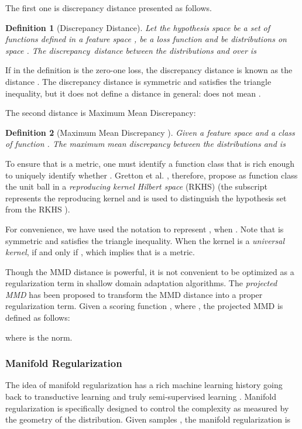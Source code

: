\documentclass[journal]{IEEEtran}
\newtheorem{Definition}{Definition}
\begin{document}
The first one is discrepancy distance presented as follows.
\begin{Definition}[{Discrepancy Distance}\cite{DBLP:conf/colt/MansourMR09}]\label{d0}Let the hypothesis space  be a set of functions defined in a feature space ,   be a  loss function and  be distributions on space . The {discrepancy~distance}  between the distributions  and  over  is

\end{Definition}

If  in the definition is the zero-one loss, the discrepancy  distance is known as the  distance \cite{DBLP:conf/nips/Ben-DavidBCP06}. The discrepancy distance is symmetric and satisfies the triangle inequality,
but it does not define a distance in general:  does not mean .

The second distance is Maximum Mean Discrepancy: 
\begin{Definition}[{Maximum Mean Discrepancy} \cite{gretton2012kernel}]\label{MMD}
Given a feature space  and a class of function  . The {maximum
mean discrepancy} between the distributions  and  is

\end{Definition}

To ensure that  is a metric, one must identify a function class  that is rich enough to uniquely identify whether . Gretton et al. \cite{gretton2012kernel}, therefore, propose as  function class  the unit ball in a \textit{reproducing kernel Hilbert space} (RKHS)  \cite{ghifary2017scatter}  (the subscript  represents the reproducing
kernel and is used to distinguish the hypothesis set  from the RKHS ).


For convenience, we have used the notation  to represent , when  \cite{gretton2012kernel}.
Note that   is symmetric and satisfies the triangle inequality. When the kernel  is a \textit{universal kernel},  if and only if , which implies that  is a metric.

Though the MMD distance is powerful, it is not convenient to be optimized as a regularization term in shallow domain adaptation algorithms. The \textit{projected MMD} \cite{pan2011domain,ghifary2017scatter,DBLP:conf/cikm/QuanzH09}  has been proposed to transform the MMD distance into a proper regularization term. Given a scoring function , where , the projected MMD is defined as follows: 

where  is the  norm.
\subsubsection{Manifold Regularization}
{The idea of manifold regularization has a rich machine learning history going back to transductive learning and truly semi-supervised learning} \cite{DBLP:journals/jmlr/BelkinNS06}. {Manifold regularization is specifically designed to control the
complexity as measured by the geometry of the distribution. Given samples , the manifold regularization is}
\end{document}
